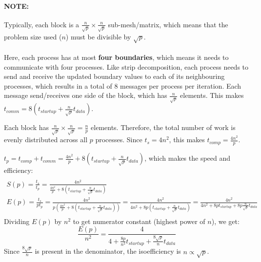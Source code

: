 \documentclass{article}
\begin{document}
\paragraph{\textbf{NOTE:}} Typically, each block is a $\frac{n}{\sqrt{p}} \times \frac{n}{\sqrt{p}}$ sub-mesh/matrix, which means that the problem size used ($n$) must be divisible by $\sqrt{p}$.
\paragraph{}

Here, each process has at most \textbf{four boundaries}, which means it needs to communicate with four processes. Like strip decomposition, each process needs to send and receive the updated boundary values to each of its neighbouring processes, which results in a total of 8 messages per process per iteration. Each message send/receives one side of the block, which has  $\frac{n}{\sqrt{p}}$ elements. This makes $t_{comm} = 8 \left( t_{startup} + \frac{n}{\sqrt{p}}t_{data} \right)$.

Each block has $\frac{n}{\sqrt{p}} \times \frac{n}{\sqrt{p}} = \frac{n}{p}$ elements. Therefore, the total number of work is evenly distributed across all $p$ processes. Since $t_s = 4n^2$, this makes $t_{comp} = \frac{4n^2}{p}$.

$t_p = t_{comp} + t_{comm} = \frac{4n^2}{p} + 8 \left( t_{startup} + \frac{n}{\sqrt{p}}t_{data} \right)$, which makes the speed and efficiency:
\begin{multline} \\
	S(p) = \frac{t_s}{t_p} = \frac{4n^2}{\frac{4n^2}{p} + 8 \left( t_{startup} + \frac{n}{\sqrt{p}}t_{data} \right)} \\
	E(p) = \frac{t_s}{pt_p} =
	\frac{4n^2}{p \left( \frac{4n^2}{p} + 8 \left( t_{startup} + \frac{n}{\sqrt{p}}t_{data} \right) \right) } =
	\frac{4n^2}{4n^2 + 8p\left( t_{startup} + \frac{n}{\sqrt{p}}t_{data} \right)} =
	\frac{4n^2}{4n^2 + 8pt_{startup} + 8p\frac{n}{\sqrt{p}}t_{data}}
	\\
	\label {eq:block-decomp-heat-speedup-efficiency}
\end{multline}
Dividing $E(p)$ by $n^2$ to get numerator constant (highest power of $n$), we get:
\begin{equation}
	\frac{E(p)}{n^2} = \frac{4}{4 + \frac{8p}{n^2}t_{startup} + \frac{8\sqrt{p}}{n}t_{data}}
	\label {eq:block-decomp-heat-isoefficiency}
\end{equation}
Since $\frac{8\sqrt{p}}{n}$ is present in the denominator, the isoefficiency is $n \propto \sqrt{p}$.
\end{document}
